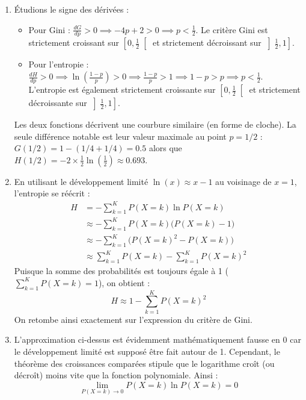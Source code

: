 \documentclass[solutions]{../exercices}
\begin{document}
\begin{solution}
\begin{enumerate}
\begin{align*}
    \end{align*}
    L'entropie $H$ et le critère de Gini admettent donc tous les deux un maximum en $p = \frac{1}{2}$.
    \item Étudions le signe des dérivées :
    \begin{itemize}
        \item Pour Gini : $\frac{dG}{dp} > 0 \implies -4p + 2 > 0 \implies p < \frac{1}{2}$. Le critère Gini est strictement croissant sur $\left[0, \frac{1}{2}\right[$ et strictement décroissant sur $\left]\frac{1}{2}, 1\right]$.
        \item Pour l'entropie : $\frac{dH}{dp} > 0 \implies \ln\left(\frac{1-p}{p}\right) > 0 \implies \frac{1-p}{p} > 1 \implies 1-p > p \implies p < \frac{1}{2}$. L'entropie est également strictement croissante sur $\left[0, \frac{1}{2}\right[$ et strictement décroissante sur $\left]\frac{1}{2}, 1\right]$.
    \end{itemize}
    Les deux fonctions décrivent une courbure similaire (en forme de cloche). La seule différence notable est leur valeur maximale au point $p=1/2$ : $G(1/2) = 1 - (1/4 + 1/4) = 0.5$ alors que $H(1/2) = -2 \times \frac{1}{2} \ln(\frac{1}{2}) \approx 0.693$.
    \item En utilisant le développement limité $\ln(x) \approx x - 1$ au voisinage de $x=1$, l'entropie se réécrit :
    \begin{align*}
        H &= - \sum_{k=1}^K P(X=k) \ln P(X=k) \\
        &\approx - \sum_{k=1}^K P(X=k) \big(P(X=k) - 1\big) \\
        &\approx - \sum_{k=1}^K \big(P(X=k)^2 - P(X=k)\big) \\
        &\approx \sum_{k=1}^K P(X=k) - \sum_{k=1}^K P(X=k)^2
    \end{align*}
    Puisque la somme des probabilités est toujours égale à 1 ($\sum_{k=1}^K P(X=k) = 1$), on obtient :
    \begin{equation*}
        H \approx 1 - \sum_{k=1}^K P(X=k)^2
    \end{equation*}
    On retombe ainsi exactement sur l'expression du critère de Gini.
    \item L'approximation ci-dessus est évidemment mathématiquement fausse en $0$ car le développement limité est supposé être fait autour de 1. Cependant, le théorème des croissances comparées stipule que le logarithme croît (ou décroît) moins vite que la fonction polynomiale. Ainsi :
    \begin{equation*}
        \lim_{P(X=k) \to 0} P(X=k) \ln P(X=k) = 0

\end{equation*}
\end{enumerate}
\end{solution}
\end{document}
